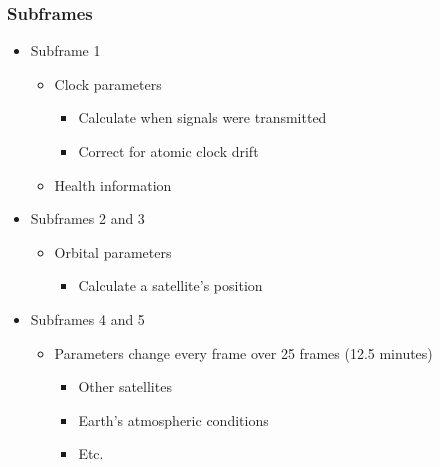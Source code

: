 \documentclass[aspectratio=169, xcolor=table]{beamer}
\begin{document}
\begin{frame}
    \frametitle{Subframes}

    \begin{itemize}
        \item<2-> Subframe 1
        
        \begin{itemize}
            \item<3-> Clock parameters
            
            \begin{itemize}
                \item<4-> Calculate when signals were transmitted
                
                \item<5-> Correct for atomic clock drift
            \end{itemize}
            
            \item<6-> Health information
        \end{itemize}

        \item<7-> Subframes 2 and 3
        
        \begin{itemize}
            \item<8-> Orbital parameters
            
            \begin{itemize}
                \item<9-> Calculate a satellite's position
            \end{itemize}
        \end{itemize}

        \item<10-> Subframes 4 and 5
        
        \begin{itemize}
            \item<11-> Parameters change every frame over 25 frames (12.5 minutes)
            
            \begin{itemize}
                \item<12-> Other satellites
                
                \item<13-> Earth's atmospheric conditions
                
                \item<14-> Etc.
            \end{itemize}
        \end{itemize}
    \end{itemize}
\end{frame}
\end{document}
